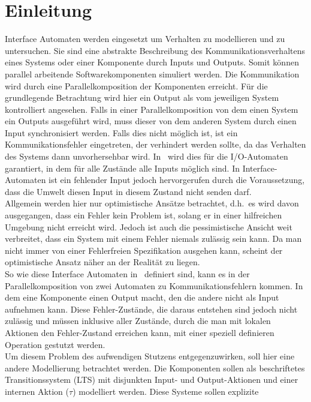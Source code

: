 \chapter{Einleitung}

Interface Automaten werden eingesetzt um Verhalten zu modellieren und zu
untersuchen. Sie sind eine abstrakte Beschreibung des Kommunikationsverhaltens
eines Systems oder einer Komponente durch Inputs und Outputs. Somit können
parallel arbeitende Softwarekomponenten simuliert werden. Die Kommunikation
wird durch eine Parallelkomposition der Komponenten erreicht. Für die
grundlegende Betrachtung wird hier ein Output als vom jeweiligen System
kontrolliert angesehen. Falls in einer Parallelkomposition von dem einen System
ein Outputs ausgeführt wird, muss dieser von dem anderen System durch einen
Input synchronisiert werden. Falls dies nicht möglich ist, ist ein
Kommunikationsfehler eingetreten, der verhindert werden sollte, da das
Verhalten des Systems dann unvorhersehbar wird. In~\cite{Lynch1996} wird dies
für die I/O-Automaten garantiert, in dem für alle Zustände alle Inputs möglich
sind. In Interface-Automaten ist ein fehlender Input jedoch hervorgerufen durch
die Voraussetzung, dass die Umwelt diesen Input in diesem Zustand nicht senden
darf.\\
Allgemein werden hier nur optimistische Ansätze betrachtet, d.h.\ es wird davon
ausgegangen, dass ein Fehler kein Problem ist, solang er in einer hilfreichen
Umgebung nicht erreicht wird. Jedoch ist auch die pessimistische Ansicht weit
verbreitet, dass ein System mit einem Fehler niemals zulässig sein kann. Da man
nicht immer von einer Fehlerfreien Spezifikation ausgehen kann, scheint der
optimistische Ansatz näher an der Realität zu liegen.\\
So wie diese Interface Automaten in~\cite{Alfaro2004} definiert sind, kann es
in der Parallelkomposition von zwei Automaten zu Kommunikationsfehlern kommen.
In dem eine Komponente einen Output macht, den die andere nicht als Input
aufnehmen kann. Diese Fehler-Zustände, die daraus entstehen sind jedoch nicht
zulässig und müssen inklusive aller Zustände, durch die man mit lokalen
Aktionen den Fehler-Zustand erreichen kann, mit einer speziell definieren
Operation gestutzt werden.\\
Um diesem Problem des aufwendigen Stutzens entgegenzuwirken, soll hier eine
andere Modellierung betrachtet werden. Die Komponenten sollen als beschriftetes
Transitionssystem (LTS) mit disjunkten Input- und Output-Aktionen und einer
internen Aktion ($\tau$) modelliert werden. Diese Systeme sollen explizite
